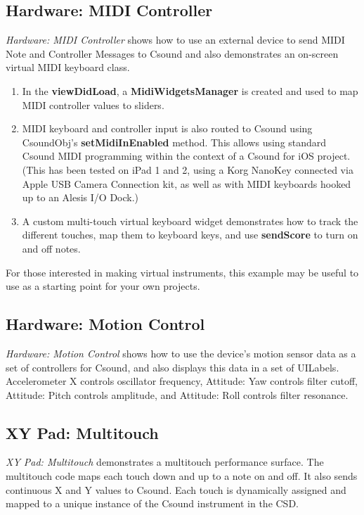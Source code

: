 \documentclass[11pt]{article}
\begin{document}
\subsection{Hardware: MIDI Controller}

\emph{Hardware: MIDI Controller} shows how to use an external device to send MIDI Note and Controller Messages to Csound and also demonstrates an on-screen virtual MIDI keyboard class.

\begin{enumerate}
\item In the \textbf{viewDidLoad}, a \textbf{MidiWidgetsManager} is created and used to map MIDI controller values to sliders.
\item MIDI keyboard and controller input is also routed to Csound using CsoundObj's \textbf{setMidiInEnabled} method. This allows using standard Csound MIDI programming within the context of a Csound for iOS project. (This has been tested on iPad 1 and 2, using a Korg NanoKey connected via Apple USB Camera Connection kit, as well as with MIDI keyboards hooked up to an Alesis I/O Dock.)
\item A custom multi-touch virtual keyboard widget demonstrates how to track the different touches, map them to keyboard keys, and use \textbf{sendScore} to turn on and off notes.
\end{enumerate}

For those interested in making virtual instruments, this example may be useful to use as a starting point for your own projects.

\subsection{Hardware: Motion Control}

\emph{Hardware: Motion Control} shows how to use the device's motion sensor data as a set of controllers for Csound, and also displays this data in a set of UILabels. Accelerometer X controls oscillator frequency, Attitude: Yaw controls filter cutoff, Attitude: Pitch controls amplitude, and Attitude: Roll controls filter resonance.

\subsection{XY Pad: Multitouch}

\emph{XY Pad: Multitouch} demonstrates a multitouch performance surface. The multitouch code maps each touch down and up to a note on and off.  It also sends continuous X and Y values to Csound.  Each touch is dynamically assigned and mapped to a unique instance of the Csound instrument in the CSD.
\end{document}
